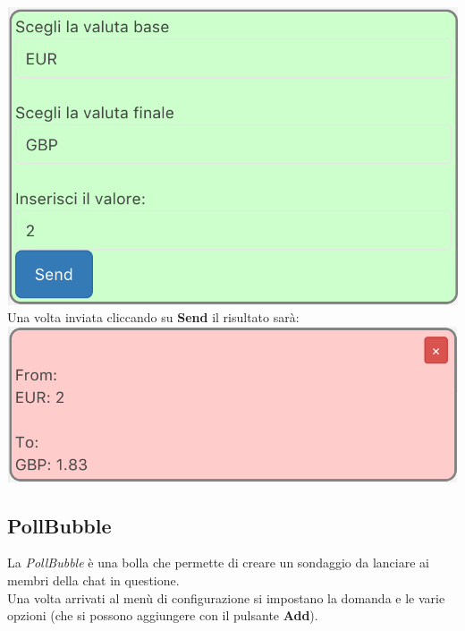 \includegraphics[scale=0.75]{img/currConfig.png}
\\
Una volta inviata cliccando su \textbf{Send} il risultato sarà:\\

\includegraphics[scale=0.75]{img/curr.png}
\newpage
\subsection{PollBubble}
La \textit{PollBubble} è una bolla che permette di creare un sondaggio da lanciare ai membri della chat in questione.\\
Una volta arrivati al menù di configurazione si impostano la domanda e le varie opzioni (che si possono aggiungere con il pulsante \textbf{Add}).
\\

